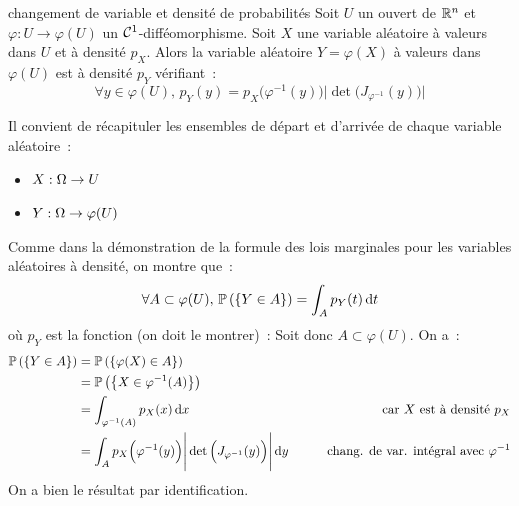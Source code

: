 \begin{theoreme}{}{changement de variable et densité de probabilités}
    Soit $U$ un ouvert de $\mathbb{R}^n$ et $\varphi : U \to \varphi(U)$ un $\mathcal{C}^1$-difféomorphisme.
   Soit $X$ une variable aléatoire à valeurs dans $U$ et à densité $p_X$. Alors la variable aléatoire $Y = \varphi(X)$ à valeurs dans $\varphi(U)$ est à densité $p_Y$ vérifiant~:
   $$\forall y \in \varphi(U),\,  p_Y(y) = p_X\Big(\varphi^{-1}(y)\Big) \Bigg\vert \det\Big(J_{\varphi^{-1}}(y)\Big)\Bigg\vert$$
\end{theoreme}

\begin{demonstration}
    Il convient de récapituler les ensembles de départ et d'arrivée de chaque variable aléatoire~:
    \begin{itemize}
        \item $X : \Omega \to U$
        \item $Y : \Omega \to \varphi(U)$
    \end{itemize}
    Comme dans la démonstration de la formule des lois marginales pour les variables aléatoires à densité, on montre que~:
    $$\forall A \subset \varphi(U),\,  \mathbb{P}\left(\left\{Y \in A\right\}\right) = \int_A p_Y(t) \,\mathrm{d}t$$
    où $p_Y$ est la fonction (on doit le montrer)~:
    Soit donc $A \subset \varphi(U)$. On a~:
    \begin{align*}
        \mathbb{P}\left(\left\{Y \in A\right\}\right) &= \mathbb{P}\left(\left\{\varphi(X) \in A\right\}\right)\\
        &= \mathbb{P}\left(\left\{X \in \varphi^{-1}(A)\right\}\right)\\
        &= \int_{\varphi^{-1}(A)} p_X(x) \,\mathrm{d}x \qquad &\text{car } X \text{ est à densité } p_X\\
        &= \int_A p_X\Big(\varphi^{-1}(y)\Big) \Bigg\vert \det\Big(J_{\varphi^{-1}}(y)\Big)\Bigg\vert \,\mathrm{d}y \qquad &\text{chang. de var. intégral avec } \varphi^{-1}\\
    \end{align*}
    On a bien le résultat par identification.
\end{demonstration}

